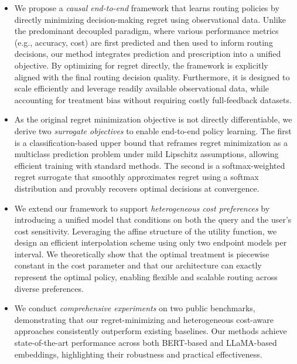 \documentclass{article}
\theoremstyle{remark}
\begin{document}
\begin{itemize}
\item We propose a \emph{causal end-to-end} framework that learns routing policies by directly minimizing decision-making regret using {observational data}. Unlike the predominant {decoupled} paradigm, where various performance metrics (e.g., accuracy, cost) are first predicted and then used to inform routing decisions, our method integrates prediction and prescription into a unified objective. By optimizing for regret directly, the framework is explicitly aligned with the final routing decision quality. Furthermore, it is designed to scale efficiently and leverage readily available observational data, while accounting for treatment bias without requiring costly full-feedback datasets.

\item As the original regret minimization objective is not directly differentiable, we derive two \emph{surrogate objectives} to enable end-to-end policy learning. The first is a {classification-based upper bound} that reframes regret minimization as a multiclass prediction problem under mild Lipschitz assumptions, allowing efficient training with standard methods. The second is a {softmax-weighted regret surrogate} that smoothly approximates regret using a softmax distribution and provably recovers optimal decisions at convergence.

\item We extend our framework to support \emph{heterogeneous cost preferences} by introducing a unified model that conditions on both the query and the user’s cost sensitivity. Leveraging the affine structure of the utility function, we design an efficient interpolation scheme using only two endpoint models per interval. We theoretically show that the optimal treatment is piecewise constant in the cost parameter and that our architecture can exactly represent the optimal policy, enabling flexible and scalable routing across diverse preferences.

\item We conduct \emph{comprehensive experiments} on two public benchmarks, demonstrating that our regret-minimizing and heterogeneous cost-aware approaches consistently outperform existing baselines. Our methods achieve state-of-the-art performance across both BERT-based and LLaMA-based embeddings, highlighting their robustness and practical effectiveness.




\end{itemize}
\end{document}
